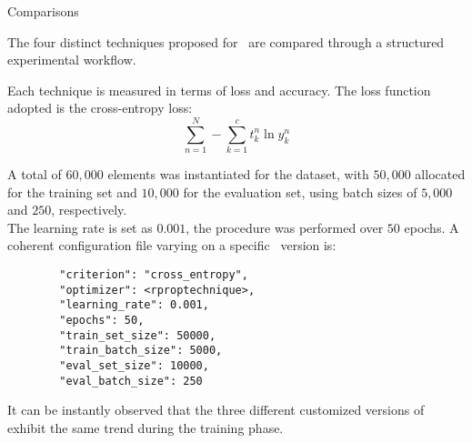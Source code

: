 \begin{section}{Comparisons}
    \par The four distinct techniques proposed for~ are compared through a structured experimental workflow.
    \par Each technique is measured in terms of loss and accuracy. The loss function adopted is the cross-entropy loss:
    \[
        \sum_{n=1}^{N} - \sum_{k=1}^{c} t_{k}^{n} \ln y_{k}^{n}
    \]
    \par A total of $60,000$ elements was instantiated for the dataset, with $50,000$ allocated for the training set and $10,000$ for the evaluation set, using batch sizes of $5,000$ and $250$, respectively.\\
    The learning rate is set as $0.001$, the procedure was performed over $50$ epochs. A coherent configuration file varying on a specific~ version is:
    \begin{verbatim}
        "criterion": "cross_entropy",
        "optimizer": <rproptechnique>,
        "learning_rate": 0.001,
        "epochs": 50,
        "train_set_size": 50000,
        "train_batch_size": 5000,
        "eval_set_size": 10000,
        "eval_batch_size": 250
    \end{verbatim}
    \begin{figure}[h!]
        \centering
        \begin{subfigure}[b]{0.48\textwidth}
            \centering
            
            \label{fig:training_loss}
        \end{subfigure}
        \hfill
        \begin{subfigure}[b]{0.48\textwidth}
            \centering
            
            \label{fig:evaluation_loss}
        \end{subfigure}
    \end{figure}
    \par It can be instantly observed that the three different customized versions of~ exhibit the same trend during the training phase.
\end{section}